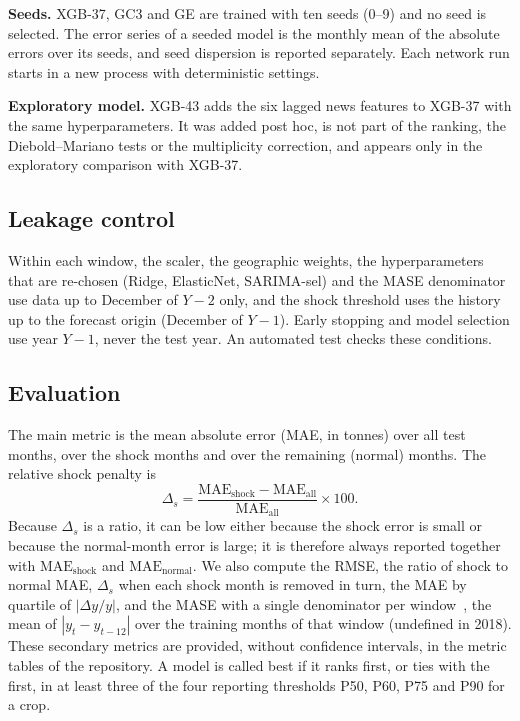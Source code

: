 \documentclass[forecasting,article,submit,moreauthors]{Definitions/mdpi}
\begin{document}
\textbf{Seeds.} XGB-37, GC3 and GE are trained with ten seeds (0--9) and no seed is selected. The error series of a seeded model is the monthly mean of the absolute errors over its seeds, and seed dispersion is reported separately. Each network run starts in a new process with deterministic settings.

\textbf{Exploratory model.} XGB-43 adds the six lagged news features to XGB-37 with the same hyperparameters. It was added post hoc, is not part of the ranking, the Diebold--Mariano tests or the multiplicity correction, and appears only in the exploratory comparison with XGB-37.

\subsection{Leakage control}
Within each window, the scaler, the geographic weights, the hyperparameters that are re-chosen (Ridge, ElasticNet, SARIMA-sel) and the MASE denominator use data up to December of $Y-2$ only, and the shock threshold uses the history up to the forecast origin (December of $Y-1$). Early stopping and model selection use year $Y-1$, never the test year. An automated test checks these conditions.

\subsection{Evaluation}
The main metric is the mean absolute error (MAE, in tonnes) over all test months, over the shock months and over the remaining (normal) months. The relative shock penalty is
\begin{equation}
\Delta_s=\frac{\mathrm{MAE}_{\text{shock}}-\mathrm{MAE}_{\text{all}}}{\mathrm{MAE}_{\text{all}}}\times 100.
\label{eq:deltas}
\end{equation}
Because $\Delta_s$ is a ratio, it can be low either because the shock error is small or because the normal-month error is large; it is therefore always reported together with $\mathrm{MAE}_{\text{shock}}$ and $\mathrm{MAE}_{\text{normal}}$. We also compute the RMSE, the ratio of shock to normal MAE, $\Delta_s$ when each shock month is removed in turn, the MAE by quartile of $|\Delta y/y|$, and the MASE with a single denominator per window~\cite{hyndman2006another}, the mean of $|y_t-y_{t-12}|$ over the training months of that window (undefined in 2018). These secondary metrics are provided, without confidence intervals, in the metric tables of the repository. A model is called best if it ranks first, or ties with the first, in at least three of the four reporting thresholds P50, P60, P75 and P90 for a crop.
\end{document}
